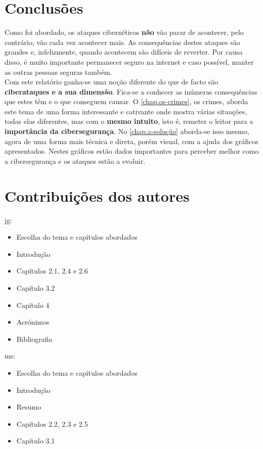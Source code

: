 \documentclass{report}
\begin{document}
\chapter{Conclusões}
\label{chap.conclusão}
Como foi abordado, os ataques cibernéticos \textbf{não} vão parar de acontecer, pelo contrário, vão cada vez acontecer mais. As consequências destes ataques são grandes e, infelizmente, quando acontecem são difíceis de reverter. Por causa disso, é muito importante permanecer seguro na internet e caso possível, manter as outras pessoas seguras também. \\ \indent Com este relatório ganha-se uma noção diferente do que de facto são \textbf{ciberataques e a sua dimensão}. Fica-se a conhecer as inúmeras consequências que estes têm e o que conseguem causar. O \autoref{chap.os-crimes}, os crimes, aborda este tema de uma forma interessante e cativante onde mostra várias situações, todas elas diferentes, mas com o \textbf{mesmo intuito}, isto é, remeter o leitor para a \textbf{importância da cibersegurança}. No \autoref{chap.a-solução} aborda-se isso mesmo, agora de uma forma mais técnica e direta, porém visual, com a ajuda dos gráficos apresentados. Nestes gráficos estão dados importantes para perceber melhor como a cibersegurança e os ataques estão a evoluir.

\chapter*{Contribuições dos autores}
\ac{jg}:
\begin{itemize}
    \item{Escolha do tema e capítulos abordados}
    \item{Introdução}
    \item{Capítulos 2.1, 2.4 e 2.6}
    \item{Capítulo 3.2}
    \item{Capítulo 4}
    \item{Acrónimos}
    \item{Bibliografia}
\end{itemize}

\ac{ms}:
\begin{itemize}
    \item{Escolha do tema e capítulos abordados}
    \item{Introdução}
    \item  {Resumo}
    \item {Capítulos 2.2, 2.3 e 2.5 }
    \item {Capítulo 3.1}
\end{itemize}
\end{document}
